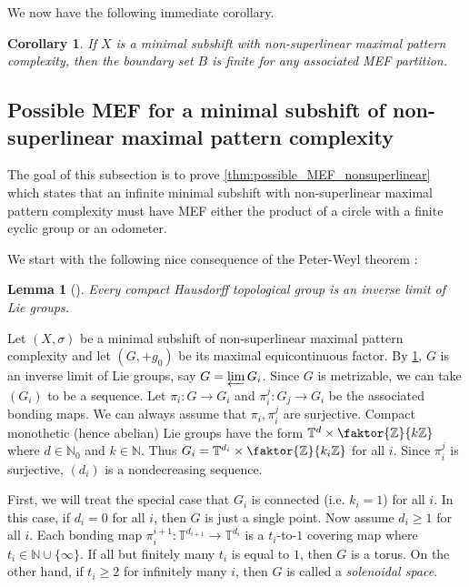 \documentclass[11pt,reqno]{amsart}
\newtheorem{lemma}[theorem]{Lemma}
\newtheorem{corollary}[theorem]{Corollary}
\theoremstyle{definition}
\theoremstyle{plain}
\newcommand{\Z}{\mathbb{Z}}
\newcommand{\N}{\mathbb{N}}
\newcommand{\T}{\mathbb{T}}
\newcommand{\AuthornoteR}[2]{{\sf\small\color{blue}{[#1: #2]}}}
\newcommand{\rp}{\AuthornoteR{R}}
\begin{document}
We now have the following immediate corollary.

\begin{corollary}\label{grpcor}
If $X$ is a minimal subshift with non-superlinear maximal pattern complexity, then the boundary set $B$ is finite for any associated MEF partition.
\end{corollary}


\subsection{Possible MEF for a minimal subshift of non-superlinear maximal pattern complexity}

The goal of this subsection is to prove \cref{thm:possible_MEF_nonsuperlinear} which states that an  infinite minimal subshift with non-superlinear maximal pattern complexity must have MEF either the product of a circle with a finite cyclic group or an odometer. %


We start with the following nice consequence of the Peter-Weyl theorem \cite{Peter_Weyl-compact_group}:
\begin{lemma}[\cite{Peter_Weyl-compact_group}]\label{thm:peter-weyl}
Every compact Hausdorff topological group is an inverse limit of Lie groups.
\end{lemma}

Let $(X, \sigma)$ be a minimal subshift of non-superlinear maximal pattern complexity and let $(G, +g_0)$ be its maximal equicontinuous factor. 
By \cref{thm:peter-weyl}, $G$ is an inverse limit of Lie groups, say $G = \varprojlim G_i$. Since $G$ is metrizable, we can take $(G_i)$ to be a sequence. Let $\pi_i: G \to G_i$ and $\pi_{i}^{j}: G_j \to G_i$ be the associated bonding maps. We can always assume that $\pi_i, \pi_{i}^j$ are surjective. Compact monothetic (hence abelian) Lie groups have the form $\T^d \times \faktor{\Z}{k\Z}$ where $d \in \N_0$ and $k \in \N$. Thus $G_i = \T^{d_i} \times \faktor{\Z}{k_i\Z}$ for all $i$. Since $\pi_{i}^j$ is surjective, $(d_i)$ is a nondecreasing sequence. 


First, we will treat the special case that $G_i$ is connected (i.e. $k_i = 1$) for all $i$. In this case, if $d_i = 0$ for all $i$, then $G$ is just a single point. Now assume $d_i \geq 1$ for all $i$.
Each bonding map $\pi_i^{i+1}: \T^{d_{i+1}} \to \T^{d_i}$ is a $t_i$-to-$1$ covering map where $t_i \in \N \cup \{\infty\}$. If all but finitely many $t_i$ is equal to $1$, then $G$ is a torus. On the other hand, if $t_i \geq 2$ for infinitely many $i$, then $G$ is called a \emph{solenoidal space}.
\end{document}
